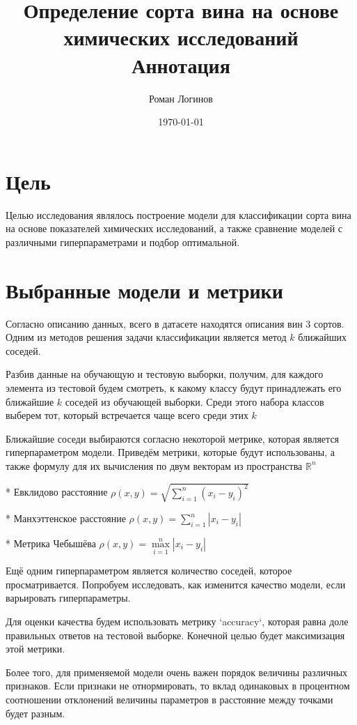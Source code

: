 \documentclass{article}
\title{Определение сорта вина на основе химических исследований \\ \large \textbf{Аннотация}}
\author{Роман Логинов}
\date{\today}
\begin{document}
\maketitle

\section{Цель}

\indent\indent Целью исследования являлось построение модели для классификации сорта вина на основе показателей химических исследований, а также сравнение моделей с различными гиперпараметрами и подбор оптимальной.

\section{Выбранные модели и метрики}

\indent\indent Согласно описанию данных, всего в датасете находятся описания вин 3 сортов. Одним из методов решения задачи классификации является метод $k$ ближайших соседей.

Разбив данные на обучающую и тестовую выборки, получим, для каждого элемента из тестовой будем смотреть, к какому классу будут принадлежать его ближайшие $k$ соседей из обучающей выборки. Среди этого набора классов выберем тот, который встречается чаще всего среди этих $k$

Ближайшие соседи выбираются согласно некоторой метрике, которая является гиперпараметром модели. Приведём метрики, которые будут использованы, а также формулу для их вычисления по двум векторам из пространства $\mathbb{R}^n$

* Евклидово расстояние $\rho(x, y) = \sqrt{\sum\limits_{i = 1}^n (x_i - y_i)^2}$

* Манхэттенское расстояние $\rho(x, y) = \sum\limits_{i = 1}^n |x_i - y_i|$

* Метрика Чебышёва $\rho(x, y) = \max\limits_{i = 1}^n |x_i - y_i|$

Ещё одним гиперпараметром является количество соседей, которое просматривается. Попробуем исследовать, как изменится качество модели, если варьировать гиперпараметры.

Для оценки качества будем использовать метрику `accuracy`, которая равна доле правильных ответов на тестовой выборке. Конечной целью будет максимизация этой метрики.

Более того, для применяемой модели очень важен порядок величины различных признаков. Если признаки не отнормировать, то вклад одинаковых в процентном соотношении отклонений величины параметров в расстояние между точками будет разным.
\end{document}
